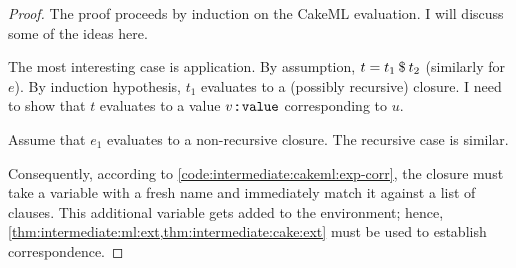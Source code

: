 \begin{proof}
  The proof proceeds by induction on the CakeML evaluation.
  I will discuss some of the ideas here.

  The most interesting case is application.
  By assumption, $t = t_1\mathbin{\$}t_2$ (similarly for $e$).
  By induction hypothesis, $t_1$ evaluates to a (possibly recursive) closure.
  I need to show that $t$ evaluates to a value $v \mathbin{:\!\!:} \texttt{\textup{value}}$ corresponding to $u$.

  Assume that $e_1$ evaluates to a non-recursive closure.
  The recursive case is similar.

  Consequently, according to \cref{code:intermediate:cakeml:exp-corr}, the closure must take a variable with a fresh name and immediately match it against a list of clauses.
  This additional variable gets added to the environment; hence, \cref{thm:intermediate:ml:ext,thm:intermediate:cake:ext} must be used to establish correspondence.
\end{proof}